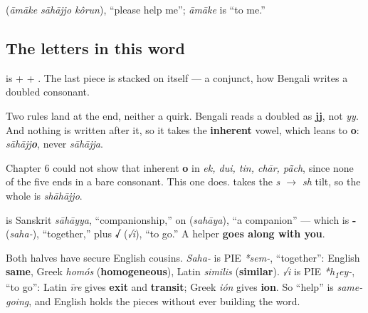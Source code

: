    (\emph{āmāke sāhājjo kôrun}), \textquotedblleft{}please help me\textquotedblright{}; \emph{āmāke} is \textquotedblleft{}to me.\textquotedblright{}

\subsection*{The letters in this word}
\textbf{} is \textbf{} + \textbf{} + \textbf{}. The last piece is \textbf{} stacked on itself — a conjunct, how Bengali writes a doubled consonant.

\begin{sounds}
Two rules land at the end, neither a quirk. Bengali reads a doubled \textbf{} as \textbf{jj}, not \emph{yy}. And nothing is written after it, so it takes the \textbf{inherent} vowel, which leans to \textbf{o}: \emph{sāhājj\textbf{o}}, never \emph{sāhājja}.

Chapter 6 could not show that inherent \textbf{o} in \emph{ek, dui, tin, chār, pā̃ch}, since none of the five ends in a bare consonant. This one does. \textbf{} takes the \emph{s $\to$ sh} tilt, so the whole is \emph{shāhājjo}.
\end{sounds}

\begin{cousinweb}
\textbf{} is Sanskrit \emph{sāhāyya}, \textquotedblleft{}companionship,\textquotedblright{} on \textbf{} (\emph{sahāya}), \textquotedblleft{}a companion\textquotedblright{} — which is \textbf{-} (\emph{saha-}), \textquotedblleft{}together,\textquotedblright{} plus \textbf{√} (\emph{√i}), \textquotedblleft{}to go.\textquotedblright{} A helper \textbf{goes along with you}.

Both halves have secure English cousins. \emph{Saha-} is PIE \emph{*sem-}, \textquotedblleft{}together\textquotedblright{}: English \textbf{same}, Greek \emph{homós} (\textbf{homogeneous}), Latin \emph{similis} (\textbf{similar}). \emph{√i} is PIE \emph{*h\textsubscript{1}ey-}, \textquotedblleft{}to go\textquotedblright{}: Latin \emph{īre} gives \textbf{exit} and \textbf{transit}; Greek \emph{ión} gives \textbf{ion}. So \textquotedblleft{}help\textquotedblright{} is \emph{same-going}, and English holds the pieces without ever building the word.
\end{cousinweb}

